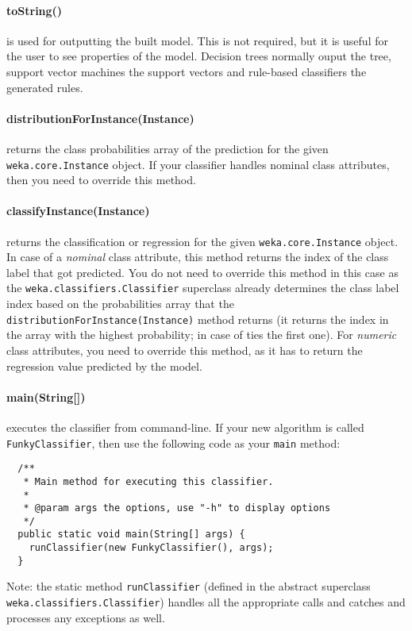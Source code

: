 \paragraph{toString()} is used for outputting the built model. This is not
required, but it is useful for the user to see properties of the model. Decision
trees normally ouput the tree, support vector machines the support vectors and
rule-based classifiers the generated rules.

\paragraph{distributionForInstance(Instance)} returns the class probabilities
array of the prediction for the given \texttt{weka.core.Instance} object. If
your classifier handles nominal class attributes, then you need to override
this method.

\paragraph{classifyInstance(Instance)} returns the classification or regression
for the given \texttt{weka.core.Instance} object. In case of a \textit{nominal}
class attribute, this method returns the index of the class label that got
predicted. You do not need to override this method in this case as the
\texttt{weka.classifiers.Classifier} superclass already determines the class
label index based on the probabilities array that the
\texttt{distributionForInstance(Instance)} method returns (it returns the index
in the array with the highest probability; in case of ties the first one). For
\textit{numeric} class attributes, you need to override this method, as it
has to return the regression value predicted by the model.

\paragraph{main(String[])} executes the classifier from command-line. If your
new algorithm is called \texttt{FunkyClassifier}, then use the following code
as your \texttt{main} method:
\begin{verbatim}
  /**
   * Main method for executing this classifier.
   *
   * @param args the options, use "-h" to display options
   */
  public static void main(String[] args) {
    runClassifier(new FunkyClassifier(), args);
  }
\end{verbatim}
Note: the static method \texttt{runClassifier} (defined in the abstract
superclass \texttt{weka.classifiers.Classifier}) handles all the appropriate
calls and catches and processes any exceptions as well.

